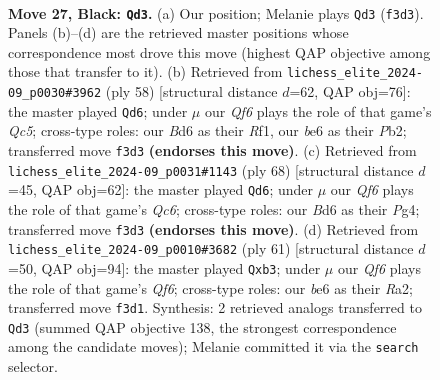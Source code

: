 \documentclass[11pt]{article}
\begin{document}
\clearpage

\begin{figure}[p]\centering
\begin{subfigure}{0.46\textwidth}\centering
\resizebox{\linewidth}{!}{%
\newchessgame
\chessboard[
  setfen={8/pp5p/3bB1pk/8/8/P4qP1/1P3P1P/4R1K1 b - - 0 27},
  showmover=false,
  pgfstyle=straightmove, color=movearrow, markmove={f3-d3}
]}
\caption{}
\end{subfigure}\hfill
\begin{subfigure}{0.46\textwidth}\centering
\resizebox{\linewidth}{!}{%
\newchessgame
\chessboard[
  setfen={r6k/1p6/2p4p/p1QpP3/3P1pq1/8/PP5P/5R1K w - - 0 30},
  showmover=false,
  pgfstyle=straightmove, color=movearrow, markmove={c5-d6}
]}
\caption{}
\end{subfigure}
\\[4pt]
\begin{subfigure}{0.46\textwidth}\centering
\resizebox{\linewidth}{!}{%
\newchessgame
\chessboard[
  setfen={8/p3r1kp/1pQ3p1/2p5/6P1/7P/P4PK1/8 w - - 1 35},
  showmover=false,
  pgfstyle=straightmove, color=movearrow, markmove={c6-d6}
]}
\caption{}
\end{subfigure}\hfill
\begin{subfigure}{0.46\textwidth}\centering
\resizebox{\linewidth}{!}{%
\newchessgame
\chessboard[
  setfen={8/5ppk/7p/1pQP4/8/1P3qP1/r4P1P/4R1K1 b - - 4 31},
  showmover=false,
  pgfstyle=straightmove, color=movearrow, markmove={f3-b3}
]}
\caption{}
\end{subfigure}
\caption{\textbf{Move 27, Black: \texttt{Qd3}.} (a) Our position; Melanie plays \texttt{Qd3} (\texttt{f3d3}). Panels (b)--(d) are the retrieved master positions whose correspondence most drove this move (highest QAP objective among those that transfer to it). (b) Retrieved from \texttt{lichess\_elite\_2024-09\_p0030\#3962} (ply 58) [structural distance $d$=62, QAP obj=76]: the master played \texttt{Qd6}; under $\mu$ our \emph{Qf6} plays the role of that game's \emph{Qc5}; cross-type roles: our \emph{B}d6 as their \emph{R}f1, our \emph{b}e6 as their \emph{P}b2; transferred move \texttt{f3d3} \textbf{(endorses this move)}. (c) Retrieved from \texttt{lichess\_elite\_2024-09\_p0031\#1143} (ply 68) [structural distance $d$=45, QAP obj=62]: the master played \texttt{Qd6}; under $\mu$ our \emph{Qf6} plays the role of that game's \emph{Qc6}; cross-type roles: our \emph{B}d6 as their \emph{P}g4; transferred move \texttt{f3d3} \textbf{(endorses this move)}. (d) Retrieved from \texttt{lichess\_elite\_2024-09\_p0010\#3682} (ply 61) [structural distance $d$=50, QAP obj=94]: the master played \texttt{Qxb3}; under $\mu$ our \emph{Qf6} plays the role of that game's \emph{Qf6}; cross-type roles: our \emph{b}e6 as their \emph{R}a2; transferred move \texttt{f3d1}. Synthesis: 2 retrieved analogs transferred to \texttt{Qd3} (summed QAP objective 138, the strongest correspondence among the candidate moves); Melanie committed it via the \texttt{search} selector.}
\label{fig:thought-m53}
\end{figure}
\end{document}
